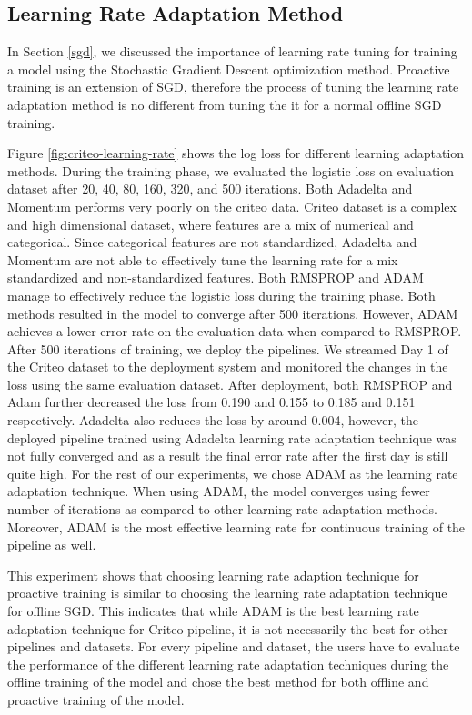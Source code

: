 \subsection{Learning Rate Adaptation Method}
In Section \ref{sgd}, we discussed the importance of learning rate tuning for training a model using the Stochastic Gradient Descent optimization method.
Proactive training is an extension of SGD, therefore the process of tuning the learning rate adaptation method is no different from tuning the it for a normal offline SGD training.

Figure \ref{fig:criteo-learning-rate} shows the log loss for different learning adaptation methods. 
During the training phase, we evaluated the logistic loss on evaluation dataset after 20, 40, 80, 160, 320, and 500 iterations.
Both Adadelta and Momentum performs very poorly on the criteo data.
Criteo dataset is a complex and high dimensional dataset, where features are a mix of numerical and categorical.
Since categorical features are not standardized, Adadelta and Momentum are not able to effectively tune the learning rate for a mix standardized and non-standardized features.
Both RMSPROP and ADAM manage to effectively reduce the logistic loss during the training phase.
Both methods resulted in the model to converge after 500 iterations.
However, ADAM achieves a lower error rate on the evaluation data when compared to RMSPROP.
After 500 iterations of training, we deploy the pipelines.
We streamed Day 1 of the Criteo dataset to the deployment system and monitored the changes in the loss using the same evaluation dataset.
After deployment, both RMSPROP and Adam further decreased the loss from 0.190 and 0.155 to 0.185 and 0.151 respectively.
Adadelta also reduces the loss by around 0.004, however, the deployed pipeline trained using Adadelta learning rate adaptation technique was not fully converged and as a result the final error rate after the first day is still quite high.
For the rest of our experiments, we chose ADAM as the learning rate adaptation technique.
When using ADAM, the model converges using fewer number of iterations as compared to other learning rate adaptation methods.
Moreover, ADAM is the most effective learning rate for continuous training of the pipeline as well.

This experiment shows that choosing learning rate adaption technique for proactive training is similar to choosing the learning rate adaptation technique for offline SGD.
This indicates that while ADAM is the best learning rate adaptation technique for Criteo pipeline, it is not necessarily the best for other pipelines and datasets.
For every pipeline and dataset, the users have to evaluate the performance of the different learning rate adaptation techniques during the offline training of the model and chose the best method for both offline and proactive training of the model.


